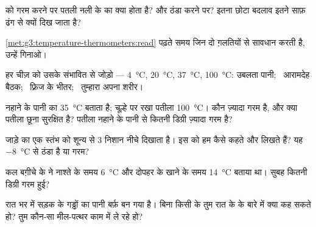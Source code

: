\begin{exercise}[$\star$]\label{exo:g3:temperature-thermometers:3}
 को गरम करने पर पतली नली के  का क्या होता है? और ठंडा
करने पर? इतना छोटा बदलाव इतने साफ़ ढंग से क्यों दिख जाता है?
\end{exercise}

\begin{exercise}[$\star$]\label{exo:g3:temperature-thermometers:4}
\cref{met:g3:temperature-thermometers:read}  पढ़ते समय
जिन दो ग़लतियों से सावधान करती है, उन्हें गिनाओ।
\end{exercise}

\begin{exercise}[$\star$]\label{exo:g3:temperature-thermometers:5}
हर चीज़ को उसके संभावित  से जोड़ो --- \qty{4}{\celsius},
\qty{20}{\celsius}, \qty{37}{\celsius}, \qty{100}{\celsius}: उबलता
पानी; \ आरामदेह बैठक; \ फ़्रिज के भीतर; \ तुम्हारा अपना शरीर।
\end{exercise}

\begin{exercise}[$\star$]\label{exo:g3:temperature-thermometers:6}
नहाने के पानी का  \qty{35}{\celsius} बताता है; चूल्हे पर रखा
पतीला \qty{100}{\celsius}। कौन ज़्यादा गरम है, और क्या पतीला छूना
सुरक्षित है? पतीला नहाने के पानी से कितनी डिग्री ज़्यादा गरम है?
\end{exercise}

\begin{exercise}[$\star$]\label{exo:g3:temperature-thermometers:7}
जाड़े का एक  स्तंभ को शून्य से $3$ निशान नीचे दिखाता है। इस
 को हम कैसे कहते और लिखते हैं? यह \qty{-8}{\celsius} से ठंडा है
या गरम?
\end{exercise}

\begin{exercise}[$\star$]\label{exo:g3:temperature-thermometers:8}
कल बग़ीचे के  ने नाश्ते के समय \qty{6}{\celsius} और दोपहर के
खाने के समय \qty{14}{\celsius} बताया था। सुबह कितनी डिग्री गरम हुई?
\end{exercise}

\begin{exercise}[$\star$]\label{exo:g3:temperature-thermometers:9}
रात भर में सड़क के गड्ढों का पानी बर्फ़ बन गया है। बिना किसी 
के तुम रात के  के बारे में क्या कह सकते हो? तुम कौन-सा मील-पत्थर
काम में ले रहे हो?
\end{exercise}


